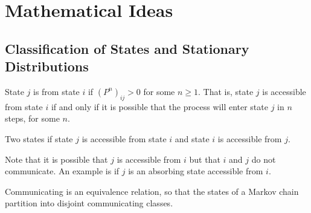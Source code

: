 \documentclass[12pt]{article}
\begin{document}
\hr

\section*{Mathematical Ideas}

\subsection*{Classification of States and Stationary Distributions}

\begin{definition}
    State \( j \) is  from state \( i \) if \( (P^{n})_
    {ij} > 0 \) for some \( n \ge 1 \).  That is, state \( j \) is
    accessible from state \( i \) if and only if it is possible that the
    process will enter state \( j \) in \( n \) steps, for some \( n \).
\end{definition}

\begin{definition}
    Two states  if state \( j \) is accessible from
    state \( i \) and state \( i \) is accessible from \( j \).
\end{definition}

\begin{remark}
    Note that it is possible that \( j \) is accessible from \( i \) but
    that \( i \) and \( j \) do not communicate.  An example is if \( j \)
    is an absorbing state accessible from \( i \).
\end{remark}

\begin{proposition}
    Communicating is an equivalence relation, so that the states of a
    Markov chain partition into disjoint communicating classes.
\end{proposition}
\end{document}
